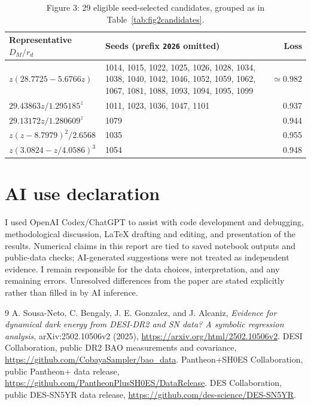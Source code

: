 \documentclass[11pt]{article}
\begin{document}
\begin{table}[htbp]
\centering\scriptsize
\caption{Figure 3: 29 eligible seed-selected candidates, grouped as in Table~\ref{tab:fig2candidates}.}
\label{tab:fig3candidates}
\begin{tabular}{@{}p{4.8cm}p{7.5cm}r@{}}
\toprule
Representative $D_M/r_d$ & Seeds (prefix \texttt{2026} omitted) & Loss\\
\midrule
$z(28.7725-5.6766z)$ & 1014, 1015, 1022, 1025, 1026, 1028, 1034, 1038, 1040, 1042, 1046, 1052, 1059, 1062, 1067, 1081, 1088, 1093, 1094, 1095, 1099 & $\simeq0.982$\\
$29.43863z/1.295185^{z}$ & 1011, 1023, 1036, 1047, 1101 & 0.937\\
$29.13172z/1.280609^{z}$ & 1079 & 0.944\\
$z(z-8.7979)^2/2.6568$ & 1035 & 0.955\\
$z(3.0824-z/4.0586)^3$ & 1054 & 0.948\\
\bottomrule
\end{tabular}
\end{table}

\section*{AI use declaration}
I used OpenAI Codex/ChatGPT to assist with code development and debugging, methodological discussion, LaTeX drafting and editing, and presentation of the results. Numerical claims in this report are tied to saved notebook outputs and public-data checks; AI-generated suggestions were not treated as independent evidence. I remain responsible for the data choices, interpretation, and any remaining errors. Unresolved differences from the paper are stated explicitly rather than filled in by AI inference.

\begin{thebibliography}{9}
 A. Sousa-Neto, C. Bengaly, J. E. Gonzalez, and J. Alcaniz, \emph{Evidence for dynamical dark energy from DESI-DR2 and SN data? A symbolic regression analysis}, arXiv:2502.10506v2 (2025), \url{https://arxiv.org/html/2502.10506v2}.
 DESI Collaboration, public DR2 BAO measurements and covariance, \url{https://github.com/CobayaSampler/bao_data}.
 Pantheon+SH0ES Collaboration, public Pantheon+ data release, \url{https://github.com/PantheonPlusSH0ES/DataRelease}.
 DES Collaboration, public DES-SN5YR data release, \url{https://github.com/des-science/DES-SN5YR}.
\end{thebibliography}
\end{document}
